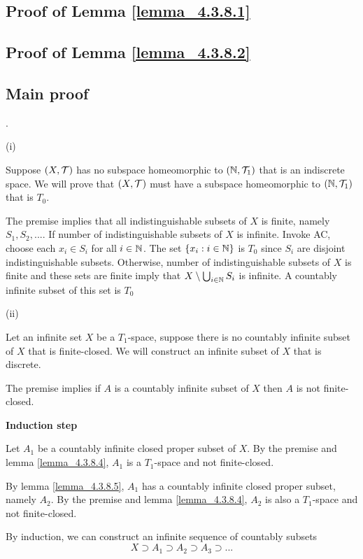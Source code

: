 \documentclass{article}
\begin{document}
\subsection*{Proof of Lemma \ref{lemma_4.3.8.1}}

\subsection*{Proof of Lemma \ref{lemma_4.3.8.2}}



\subsection*{Main proof} .

(i)

Suppose $(X, \mathcal{T})$ has no subspace homeomorphic to $(\mathbb{N}, \mathcal{T}_1)$ that is an indiscrete space. We will prove that $(X, \mathcal{T})$ must have a subspace homeomorphic to $(\mathbb{N}, \mathcal{T}_1)$ that is $T_0$.

The premise implies that all indistinguishable subsets of $X$ is finite, namely $S_1, S_2, ...$. If number of indistinguishable subsets of $X$ is infinite. Invoke AC, choose each $x_i \in S_i$ for all $i \in \mathbb{N}$. The set $\{ x_i: i \in \mathbb{N} \}$ is $T_0$ since $S_i$ are disjoint indistinguishable subsets. Otherwise, number of indistinguishable subsets of $X$ is finite and these sets are finite imply that $X \setminus \bigcup_{i \in \mathbb{N}} S_i$ is infinite. A countably infinite subset of this set is $T_0$

(ii)

Let an infinite set $X$ be a $T_1$-space, suppose there is no countably infinite subset of $X$ that is finite-closed. We will construct an infinite subset of $X$ that is discrete.

The premise implies if $A$ is a countably infinite subset of $X$ then $A$ is not finite-closed.

\textbf{Induction step}

Let $A_1$ be a countably infinite closed proper subset of $X$. By the premise and lemma \ref{lemma_4.3.8.4}, $A_1$ is a $T_1$-space and not finite-closed.

By lemma \ref{lemma_4.3.8.5}, $A_1$ has a countably infinite closed proper subset, namely $A_2$. By the premise and lemma \ref{lemma_4.3.8.4}, $A_2$ is also a $T_1$-space and not finite-closed.

By induction, we can construct an infinite sequence of countably subsets
$$
    X \supset A_1 \supset A_2 \supset A_3 \supset ...
$$
\end{document}

